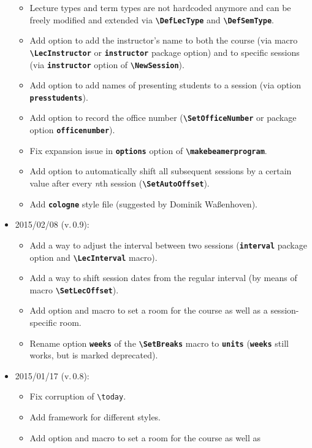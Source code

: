 \documentclass[english]{article}
\newcommand*\jmacro[1]{\textbf{\texttt{#1}}}
\newcommand*\jcsmacro[1]{\jmacro{\textbackslash{#1}}}
\newcommand*\joption[1]{\textbf{\texttt{#1}}}
\newcommand*\jfmacro[1]{\texttt{#1}}
\newcommand*\jfcsmacro[1]{\jfmacro{\textbackslash{#1}}}
\begin{document}
\begin{itemize}
\begin{itemize}
       \item Lecture types and term types are not hardcoded anymore and can be freely
             modified and extended via \jcsmacro{DefLecType} and \jcsmacro{DefSemType}.
       \item Add option to add the instructor's name to both the course (via macro
             \jcsmacro{LecInstructor} or \joption{instructor} package option) and
             to specific sessions (via \joption{instructor} option of
             \jcsmacro{NewSession}).
       \item Add option to add names of presenting students to a session (via option
             \joption{presstudents}).
       \item Add option to record the office number (\jcsmacro{SetOfficeNumber}
             or package option \joption{officenumber}).
       \item Fix expansion issue in \joption{options} option of \jcsmacro{makebeamerprogram}.
       \item Add option to automatically shift all subsequent sessions by a certain value
             after every \emph{n}th session (\jcsmacro{SetAutoOffset}).
       \item Add \joption{cologne} style file (suggested by Dominik Waßenhoven).
    \end{itemize}
\item 2015/02/08 (v.\,0.9):
     \begin{itemize}
       \item Add a way to adjust the interval between two sessions
             (\joption{interval} package option and \jcsmacro{LecInterval} macro).
       \item Add a way to shift session dates from the regular interval
             (by means of macro \jcsmacro{SetLecOffset}).
       \item Add option and macro to set a room for the course as well as
             a session-specific room.
       \item Rename option \joption{weeks} of the \jcsmacro{SetBreaks} macro
             to \joption{units} (\joption{weeks} still works, but is marked deprecated).
    \end{itemize} 
\item 2015/01/17 (v.\,0.8):
    \begin{itemize}
       \item Fix corruption of \jfcsmacro{today}.
       \item Add framework for different styles.
       \item Add option and macro to set a room for the course as well as

\end{itemize}
\end{itemize}
\end{document}
